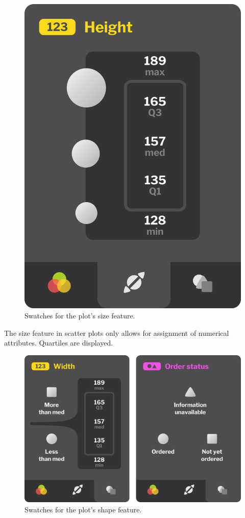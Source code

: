 \documentclass[thesis=M,english,hidelinks]{FITthesisXE}[2012/06/26]
\begin{document}
\begin{figure}[ht]
\centering
\includegraphics[scale=0.075]{statistics_size}
\caption{Swatches for the plot's size feature.}
\label{fig:statistics_size}
\end{figure}

The size feature in scatter plots only allows for assignment of numerical attributes. Quartiles are displayed.

\begin{figure}[ht]
\centering
\includegraphics[scale=0.05]{statistics_shape}
\caption{Swatches for the plot's shape feature.}
\label{fig:statistics_shape}
\end{figure}
\end{document}
